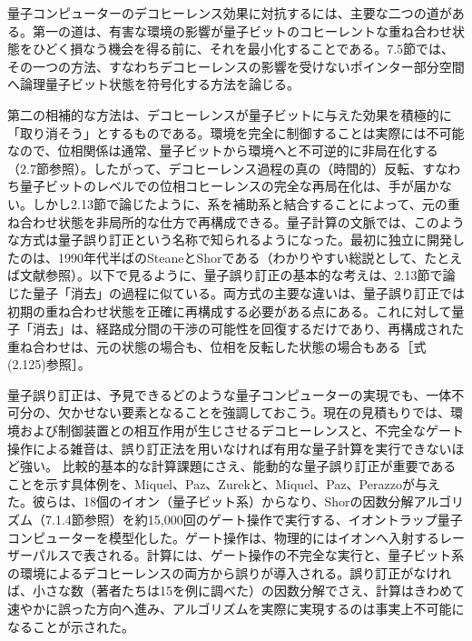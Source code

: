 量子コンピューターのデコヒーレンス効果に対抗するには、主要な二つの道がある。第一の道は、有害な環境の影響が量子ビットのコヒーレントな重ね合わせ状態をひどく損なう機会を得る前に、それを最小化することである。7.5節では、その一つの方法、すなわちデコヒーレンスの影響を受けないポインター部分空間へ論理量子ビット状態を符号化する方法を論じる。

第二の相補的な方法は、デコヒーレンスが量子ビットに与えた効果を積極的に「取り消そう」とするものである。環境を完全に制御することは実際には不可能なので、位相関係は通常、量子ビットから環境へと不可逆的に非局在化する（2.7節参照）。したがって、デコヒーレンス過程の真の（時間的）反転、すなわち量子ビットのレベルでの位相コヒーレンスの完全な再局在化は、手が届かない。しかし2.13節で論じたように、系を補助系と結合することによって、元の重ね合わせ状態を非局所的な仕方で再構成できる。量子計算の文脈では、このような方式は量子誤り訂正という名称で知られるようになった。最初に独立に開発したのは、1990年代半ばのSteane\cite{ref354}とShor\cite{ref355}である（わかりやすい総説として、たとえば文献\cite{ref056,ref356,ref357}参照）。以下で見るように、量子誤り訂正の基本的な考えは、2.13節で論じた量子「消去」の過程に似ている。両方式の主要な違いは、量子誤り訂正では初期の重ね合わせ状態を正確に再構成する必要がある点にある。これに対して量子「消去」は、経路成分間の干渉の可能性を回復するだけであり、再構成された重ね合わせは、元の状態の場合も、位相を反転した状態の場合もある［式(2.125)参照］。

量子誤り訂正は、予見できるどのような量子コンピューターの実現でも、一体不可分の、欠かせない要素となることを強調しておこう。現在の見積もりでは、環境および制御装置との相互作用が生じさせるデコヒーレンスと、不完全なゲート操作による雑音は、誤り訂正法を用いなければ有用な量子計算を実行できないほど強い。
\hypertarget{srcpage:305}{}\label{srcpage:305}
比較的基本的な計算課題にさえ、能動的な量子誤り訂正が重要であることを示す具体例を、Miquel、Paz、Zurek\cite{ref350}と、Miquel、Paz、Perazzo\cite{ref358}が与えた。彼らは、18個のイオン（量子ビット系）からなり、Shorの因数分解アルゴリズム\cite{ref344,ref345}（7.1.4節参照）を約15,000回のゲート操作で実行する、イオントラップ量子コンピューターを模型化した。ゲート操作は、物理的にはイオンへ入射するレーザーパルスで表される。計算には、ゲート操作の不完全な実行\cite{ref350}と、量子ビット系の環境によるデコヒーレンス\cite{ref358}の両方から誤りが導入される。誤り訂正がなければ、小さな数（著者たちは15を例に調べた）の因数分解でさえ、計算はきわめて速やかに誤った方向へ進み、アルゴリズムを実際に実現するのは事実上不可能になることが示された。

